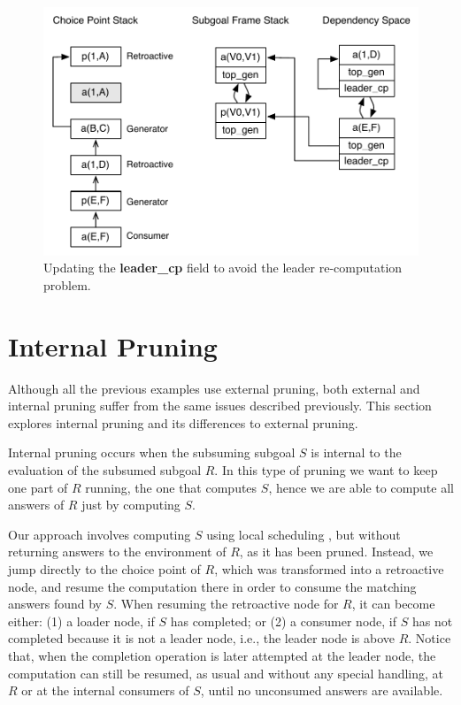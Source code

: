 \begin{figure}[ht]
  \centering
    \includegraphics[scale=0.6]{retro_leader_recomputation2.pdf}
  \caption{Updating the \textbf{leader\_cp} field to avoid the leader re-computation problem.}
  \label{fig:retro_leader_recomputation2}
\end{figure}

\section{Internal Pruning}

Although all the previous examples use external pruning, both external and internal pruning
suffer from the same issues described previously. This section explores internal pruning
and its differences to external pruning.

Internal pruning occurs when the subsuming subgoal $S$ is internal to the evaluation of the
subsumed subgoal $R$. In this type of pruning we want to keep one part of $R$ running, the one
that computes $S$, hence we are able to compute all answers of $R$ just by computing $S$.

Our approach involves computing $S$ using local scheduling \cite{Freire-96}, but without returning
answers to the environment of $R$, as it has been pruned. Instead, we jump directly to the
choice point of $R$, which was transformed into a retroactive node, and resume the computation there
in order to consume the matching answers found by $S$. When resuming the retroactive node for $R$, it
can become either: (1) a loader node, if $S$ has completed; or (2) a consumer node, if $S$ has not
completed because it is not a leader node, i.e., the leader node is above $R$.
Notice that, when the completion operation is later attempted at the leader node, the computation can
still be resumed, as usual and without any special handling, at $R$ or at the internal consumers of $S$,
until no unconsumed answers are available.

